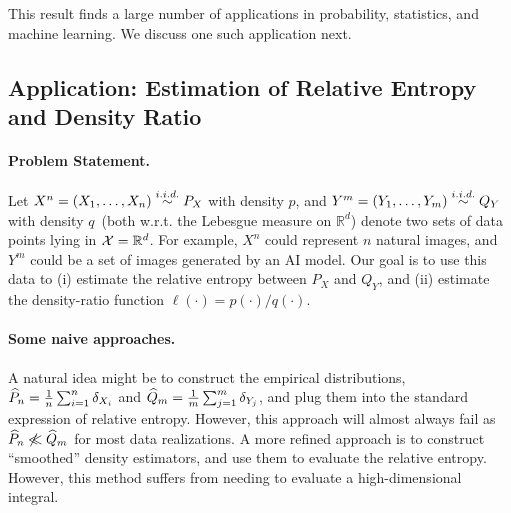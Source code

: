 \documentclass[12pt]{article}
\begin{document}
This result finds a large number of applications in probability, statistics, and machine learning. We discuss one such application next. 

\subsection{Application: Estimation of Relative Entropy and Density Ratio}
\label{subsec:application-DV-KL-estimation} 

\paragraph{Problem Statement.} Let $X^n = (X_1, \ldots, X_n) \stackrel{i.i.d.}{\sim} P_X$ with density $p$, and $Y^m = (Y_1, \ldots, Y_m) \stackrel{i.i.d.}{\sim} Q_Y$ with density $q$~(both w.r.t. the Lebesgue measure on $\mathbb{R}^d$) denote two sets of data points lying in ${\cal X} = \mathbb{R}^d$. For example, $X^n$ could represent $n$ natural images, and $Y^m$ could be a set of images generated by an AI model. Our goal is to use this data to (i) estimate the relative entropy between $P_X$ and $Q_Y$, and (ii) estimate the density-ratio function $\ell(\cdot) = p(\cdot)/q(\cdot)$. 

\paragraph{Some naive approaches.} A natural idea might be to construct the empirical distributions, $\widehat{P}_n = \frac{1}{n} \sum_{i=1}^n \delta_{X_i}$ and $\widehat{Q}_m = \frac{1}{m} \sum_{j=1}^m \delta_{Y_j}$, and plug them into the standard expression of relative entropy. However, this approach will almost always fail as $\widehat{P}_n \not \ll \widehat{Q}_m$ for most data realizations. A more refined approach is to construct ``smoothed'' density estimators, and use them to evaluate the relative entropy. However, this method suffers from needing to evaluate a high-dimensional integral. 
\end{document}
